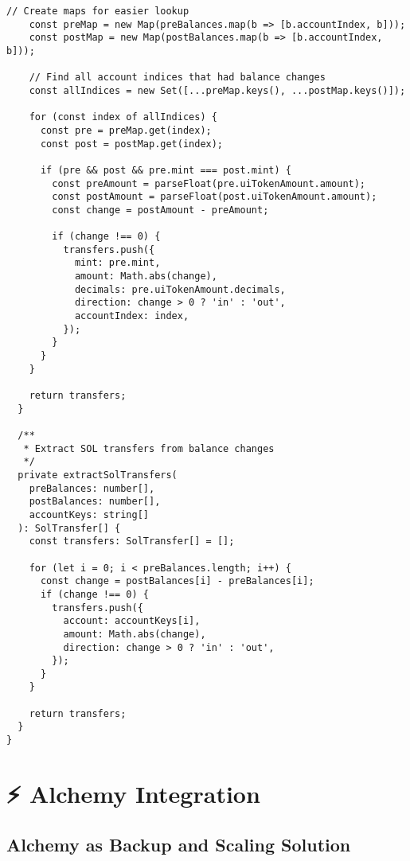 \documentclass[11pt,a4paper]{article}
\begin{document}
\begin{lstlisting}[style=typescript, caption=Helius RPC Service with Advanced Features]
    // Create maps for easier lookup
    const preMap = new Map(preBalances.map(b => [b.accountIndex, b]));
    const postMap = new Map(postBalances.map(b => [b.accountIndex, b]));

    // Find all account indices that had balance changes
    const allIndices = new Set([...preMap.keys(), ...postMap.keys()]);

    for (const index of allIndices) {
      const pre = preMap.get(index);
      const post = postMap.get(index);

      if (pre && post && pre.mint === post.mint) {
        const preAmount = parseFloat(pre.uiTokenAmount.amount);
        const postAmount = parseFloat(post.uiTokenAmount.amount);
        const change = postAmount - preAmount;

        if (change !== 0) {
          transfers.push({
            mint: pre.mint,
            amount: Math.abs(change),
            decimals: pre.uiTokenAmount.decimals,
            direction: change > 0 ? 'in' : 'out',
            accountIndex: index,
          });
        }
      }
    }

    return transfers;
  }

  /**
   * Extract SOL transfers from balance changes
   */
  private extractSolTransfers(
    preBalances: number[],
    postBalances: number[],
    accountKeys: string[]
  ): SolTransfer[] {
    const transfers: SolTransfer[] = [];

    for (let i = 0; i < preBalances.length; i++) {
      const change = postBalances[i] - preBalances[i];
      if (change !== 0) {
        transfers.push({
          account: accountKeys[i],
          amount: Math.abs(change),
          direction: change > 0 ? 'in' : 'out',
        });
      }
    }

    return transfers;
  }
}
\end{lstlisting}

\section{⚡ Alchemy Integration}

\subsection{Alchemy as Backup and Scaling Solution}
\end{document}
